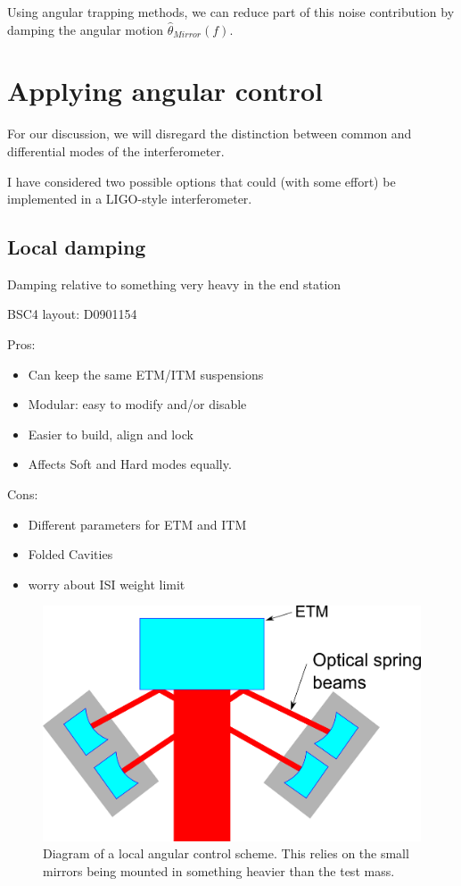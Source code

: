 Using angular trapping methods, we can reduce part of this noise contribution by damping the angular motion $\hat{\theta}_{Mirror}(f)$.

\section{Applying angular control}

For our discussion, we will disregard the distinction between common and differential modes of the interferometer.

I have considered two possible options that could (with some effort) be implemented in a LIGO-style interferometer.

\subsection{Local damping}

Damping relative to something very heavy in the end station

BSC4 layout: D0901154

Pros:

\begin{itemize}
	\item Can keep the same ETM/ITM suspensions
	\item Modular: easy to modify and/or disable
	\item Easier to build, align and lock
	\item Affects Soft and Hard modes equally.
\end{itemize}

Cons:
\begin{itemize}
  \item	Different parameters for ETM and ITM
	\item Folded Cavities
	\item worry about ISI weight limit
\end{itemize}



\begin{figure}[htp]%
\begin{center}
\includegraphics[width=.8\textwidth]{figures/application/shortTrapDiagram}%
\caption[Local angular control]{Diagram of a local angular control scheme. This relies on the small mirrors being mounted in something heavier than the test mass.}%
\label{fig:shorttrapdiagram}%
\end{center}
\end{figure}


